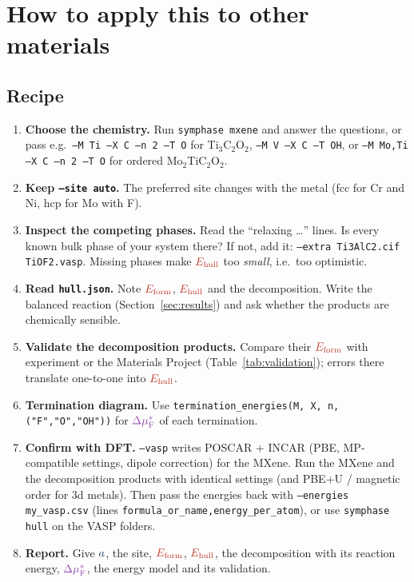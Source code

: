 \documentclass[11pt,a4paper]{article}
\newcommand{\Ef}{\textcolor{ecol}{E_{\mathrm{form}}}}
\newcommand{\Eh}{\textcolor{ecol}{E_{\mathrm{hull}}}}
\newcommand{\dmustar}{\textcolor{mucol}{\Delta\mu_{\mathrm F}^{*}}}
\newcommand{\alat}{\textcolor{gcol}{a}}
\begin{document}
\section{How to apply this to other materials}
\label{sec:apply}

\subsection{Recipe}
\begin{enumerate}[label=\textbf{Step \arabic*.},leftmargin=4.2em]
\item \textbf{Choose the chemistry.} Run \texttt{symphase mxene} and answer the questions, or pass e.g.\ \texttt{--M Ti --X C --n 2 --T O} for Ti$_3$C$_2$O$_2$,
\texttt{--M V --X C --T OH}, or \texttt{--M Mo,Ti --X C --n 2 --T O} for ordered Mo$_2$TiC$_2$O$_2$.
\item \textbf{Keep \texttt{--site auto}.} The preferred site changes with the metal (fcc for Cr and Ni, hcp for Mo with F).
\item \textbf{Inspect the competing phases.} Read the ``relaxing \dots'' lines. Is every known bulk phase of your system there? If not, add it:
\texttt{--extra Ti3AlC2.cif TiOF2.vasp}. Missing phases make $\Eh$ too \emph{small}, i.e.\ too optimistic.
\item \textbf{Read \texttt{hull.json}.} Note $\Ef$, $\Eh$ and the decomposition. Write the balanced reaction (Section~\ref{sec:results}) and ask whether the products are
chemically sensible.
\item \textbf{Validate the decomposition products.} Compare their $\Ef$ with experiment or the Materials Project (Table~\ref{tab:validation}); errors there translate
one-to-one into $\Eh$.
\item \textbf{Termination diagram.} Use \texttt{termination\_energies(M, X, n, ("F","O","OH"))} for $\dmustar$ of each termination.
\item \textbf{Confirm with DFT.} \texttt{--vasp} writes POSCAR + INCAR (PBE, MP-compatible settings, dipole correction) for the MXene. Run the MXene and the
decomposition products with identical settings (and PBE+U / magnetic order for 3d metals). Then pass the energies back with
\texttt{--energies my\_vasp.csv} (lines \texttt{formula\_or\_name,energy\_per\_atom}), or use \texttt{symphase hull} on the VASP folders.
\item \textbf{Report.} Give $\alat$, the site, $\Ef$, $\Eh$, the decomposition with its reaction energy, $\dmustar$, the energy model and its validation.
\end{enumerate}
\end{document}

